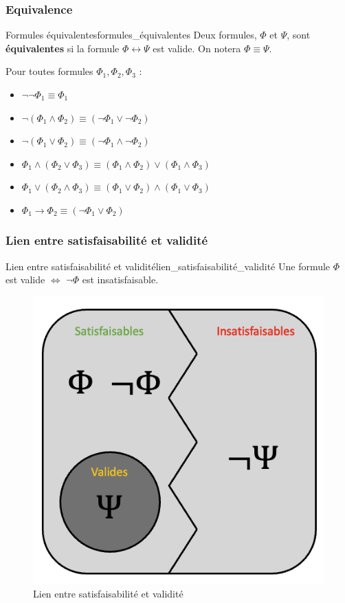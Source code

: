 \subsubsection{Equivalence}

\begin{definition}{Formules équivalentes}{formules_équivalentes}
Deux formules, $\Phi$ et $\Psi$, sont \textbf{équivalentes} si la formule $\Phi\leftrightarrow\Psi$ est valide. On notera $\Phi\equiv\Psi$.
\end{definition}
Pour toutes formules $\Phi_1,\Phi_2,\Phi_3$ :
\begin{itemize}[label=$\bullet$]
  \item $\neg\neg\Phi_1\equiv\Phi_1$
  \item $\neg(\Phi_1\land\Phi_2)\equiv(\neg\Phi_1\lor\neg\Phi_2)$
  \item $\neg(\Phi_1\lor\Phi_2)\equiv(\neg\Phi_1\land\neg\Phi_2)$
  \item $\Phi_1\land(\Phi_2\lor\Phi_3)\equiv(\Phi_1\land\Phi_2)\lor(\Phi_1\land\Phi_3)$
  \item $\Phi_1\lor(\Phi_2\land\Phi_3)\equiv(\Phi_1\lor\Phi_2)\land(\Phi_1\lor\Phi_3)$
  \item $\Phi_1\rightarrow\Phi_2\equiv(\neg\Phi_1\lor\Phi_2)$
\end{itemize}

\subsubsection{Lien entre satisfaisabilité et validité}
\begin{theorem}{Lien entre satisfaisabilité et validité}{lien_satisfaisabilité_validité}
  Une formule $\Phi$ est valide $\Leftrightarrow$ $\neg\Phi$ est insatisfaisable.
\end{theorem}
\begin{figure}[H]
  \centering
  \includegraphics[scale=0.3]{pictures/satisf:vali.png}
  \caption{Lien entre satisfaisabilité et validité}
\end{figure}


